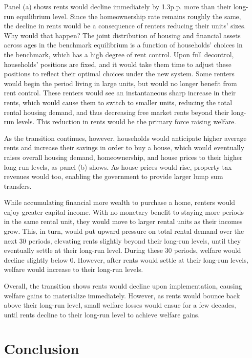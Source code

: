 \documentclass[parskip=full]{article}
\begin{document}
Panel (a) shows rents would decline immediately by 1.3p.p. more than their long-run equilibrium level. Since the homeownership rate remains roughly the same, the decline in rents would be a consequence of renters reducing their units' sizes. Why would that happen? The joint distribution of housing and financial assets across ages in the benchmark equilibrium is a function of households' choices in the benchmark, which has a high degree of rent control. Upon full decontrol, households' positions are fixed, and it would take them time to adjust these positions to reflect their optimal choices under the new system. Some renters would begin the period living in large units, but would no longer benefit from rent control. These renters would see an instantaneous sharp increase in their rents, which would cause them to switch to smaller units, reducing the total rental housing demand, and thus decreasing free market rents beyond their long-run levels. This reduction in rents would be the primary force raising welfare. 

As the transition continues, however, households would anticipate higher average rents and increase their savings in order to buy a house, which would eventually raises overall housing demand, homeownership, and house prices to their higher long-run levels, as panel (b) shows. As house prices would rise, property tax revenues would too, enabling the government to provide larger lump sum transfers.

While accumulating financial more wealth to purchase a home, renters would enjoy greater capital income. With no monetary benefit to staying more periods in the same rental unit, they would move to larger rental units as their incomes grow. This, in turn, would put upward pressure on total rental demand over the next 30 periods, elevating rents slightly beyond their long-run levels, until they eventually settle at their long-run level. During these 30 periods, welfare would decline slightly below 0. However, after rents would settle at their long-run levels, welfare would increase to their long-run levels.

Overall, the transition shows rents would decline upon implementation, causing welfare gains to materialize immediately. However, as rents would bounce back above their long-run level, small welfare losses would ensue for a few decades, until rents decline to their long-run level to achieve welfare gains.

\section{Conclusion}\label{sec:conclusion}
\end{document}
